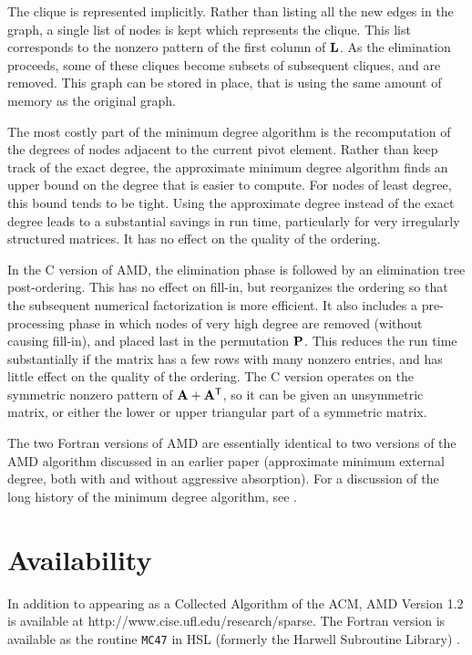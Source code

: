 \documentclass[11pt]{article}
\newcommand{\m}[1]{{\bf{#1}}}       %
\newcommand{\tr}{^{\sf T}}          %
\begin{document}
The clique is represented implicitly.  Rather than listing all the
new edges in the graph, a single list of nodes is kept which represents
the clique.  This list corresponds to the nonzero pattern of the first
column of $\m{L}$.  As the elimination proceeds, some of these cliques
become subsets of subsequent cliques, and are removed.   This graph
can be stored in place, that is
using the same amount of memory as the original graph.

The most costly part of the minimum degree algorithm is the recomputation
of the degrees of nodes adjacent to the current pivot element.
Rather than keep track of the exact degree, the approximate minimum degree
algorithm finds an upper bound on the degree that is easier to compute.
For nodes of least degree, this bound tends to be tight.  Using the
approximate degree instead of the exact degree leads to a substantial savings
in run time, particularly for very irregularly structured matrices.
It has no effect on the quality of the ordering.

In the C version of AMD, the elimination phase is followed by an
elimination tree post-ordering.  This has no effect on fill-in, but
reorganizes the ordering so that the subsequent numerical factorization is
more efficient.  It also includes a pre-processing phase in which nodes of
very high degree are removed (without causing fill-in), and placed last in the
permutation $\m{P}$.  This reduces the run time substantially if the matrix
has a few rows with many nonzero entries, and has little effect on the quality
of the ordering.
The C version operates on the
symmetric nonzero pattern of $\m{A}+\m{A}\tr$, so it can be given
an unsymmetric matrix, or either the lower or upper triangular part of
a symmetric matrix.

The two Fortran versions of AMD are essentially identical to two versions of
the AMD algorithm discussed in an earlier paper \cite{AmestoyDavisDuff96}
(approximate minimum external degree, both with and without aggressive
absorption).
For a discussion of the long history of the minimum degree algorithm,
see \cite{GeorgeLiu89}.

\section{Availability}

In addition to appearing as a Collected Algorithm of the ACM,
AMD Version 1.2 is available at http://www.cise.ufl.edu/research/sparse.
The Fortran version is available as the routine {\tt MC47} in HSL
(formerly the Harwell Subroutine Library) \cite{hsl:2002}.
\end{document}
